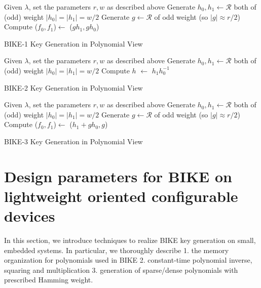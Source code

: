 \documentclass[runningheads]{llncs}
\begin{document}
\begin{algorithm}[!tbh]
 \DontPrintSemicolon %
    Given $\lambda$, set the parameters $r,w$ as described above\;
    Generate $h_0,h_1 \gets \mathcal{R}$ both of (odd) weight $|h_0|=|h_1|=w/2$\;
    Generate $g \gets \mathcal{R}$ of odd weight (so $|g|\approx r/2$)\;
    Compute ($f_0,f_1$)$\gets$ ($gh_1,gh_0$)\;
 \caption{BIKE-1 Key Generation in Polynomial View \cite{aragon2017bike}}\label{alg:bike1_keygen}
\end{algorithm}

\begin{algorithm}[!tbh]
 \DontPrintSemicolon %
    Given $\lambda$, set the parameters $r,w$ as described above\;
    Generate $h_0,h_1 \gets \mathcal{R}$ both of (odd) weight $|h_0|=|h_1|=w/2$\;
    Compute $h$ $\gets$ $h_1h_0^{-1}$\;
 \caption{BIKE-2 Key Generation in Polynomial View  \cite{aragon2017bike}}\label{alg:bike2_keygen}
\end{algorithm}

\begin{algorithm}[!tbh]
 \DontPrintSemicolon %
    Given $\lambda$, set the parameters $r,w$ as described above\;
    Generate $h_0,h_1 \gets \mathcal{R}$ both of (odd) weight $|h_0|=|h_1|=w/2$\;
    Generate $g \gets \mathcal{R}$ of odd weight (so $|g|\approx r/2$)\;
    Compute ($f_0,f_1$)$\gets$ ($h_1+gh_0,g$)\;
 \caption{BIKE-3 Key Generation in Polynomial View  \cite{aragon2017bike}}\label{alg:bike3_keygen}
\end{algorithm}

\section{Design parameters for BIKE on lightweight oriented configurable devices}
In this section, we introduce techniques to realize BIKE key generation on small, embedded systems. In particular, we thoroughly describe 1. the memory organization for polynomials used in BIKE 2. constant-time polynomial inverse, squaring and  multiplication 3. generation of sparse/dense polynomials with prescribed Hamming weight.
\end{document}
